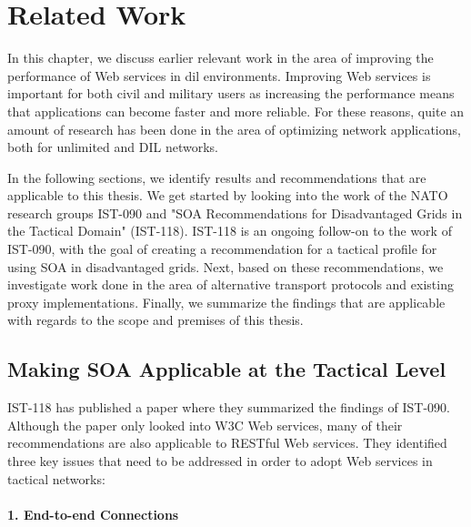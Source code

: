 \chapter{Related Work}
\label{chapter:related-work}


In this chapter, we discuss earlier relevant work in the area of improving the
performance of Web services in \gls{dil} environments. Improving Web services is
important for both civil and military users as increasing the performance means
that applications can become faster and more reliable. For these reasons, quite
an amount of research has been done in the area of optimizing network
applications, both for unlimited and DIL networks.

In the following sections, we identify results and recommendations that are
applicable to this thesis. We get started by looking into the work of the NATO
research groups IST-090 and "SOA Recommendations for Disadvantaged Grids in
the Tactical Domain" (IST-118). IST-118 is an ongoing follow-on to the work of
IST-090, with the goal of creating a recommendation for a tactical profile for
using SOA in disadvantaged grids. Next, based on these recommendations, we
investigate work done in the area of alternative transport protocols and
existing proxy implementations.  Finally, we summarize the findings that are
applicable with regards to the scope and premises of this thesis.

\section{Making SOA Applicable at the Tactical Level}

IST-118 has published a paper\cite{ist-118} where they summarized the findings
of IST-090. Although the paper only looked into W3C Web services, many of their
recommendations are also applicable to RESTful Web services. They identified
three key issues that need to be addressed in order to adopt Web services in
tactical networks:

\label{section:DIL-problems}

\subsubsection{1. End-to-end Connections}

